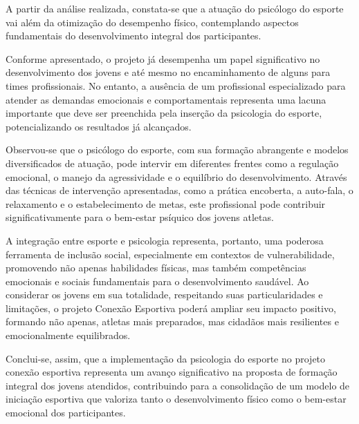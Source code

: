 \begin{Conclusao} %
A partir da análise realizada, constata-se que a atuação do psicólogo do esporte vai além da otimização do desempenho físico, contemplando aspectos fundamentais do desenvolvimento integral dos participantes.

Conforme apresentado, o projeto já desempenha um papel significativo no desenvolvimento dos jovens e até mesmo no encaminhamento de alguns para times profissionais. No entanto, a ausência de um profissional especializado para atender as demandas emocionais e comportamentais representa uma lacuna importante que deve ser preenchida pela inserção da psicologia do esporte, potencializando os resultados já alcançados.

Observou-se que o psicólogo do esporte, com sua formação abrangente e modelos diversificados de atuação, pode intervir em diferentes frentes como a regulação emocional, o manejo da agressividade e o equilíbrio do desenvolvimento. Através das técnicas de intervenção apresentadas, como a prática encoberta, a auto-fala, o relaxamento e o estabelecimento de metas, este profissional pode contribuir significativamente para o bem-estar psíquico dos jovens atletas.

A integração entre esporte e psicologia representa, portanto, uma poderosa ferramenta de inclusão social, especialmente em contextos de vulnerabilidade, promovendo não apenas habilidades físicas, mas também competências emocionais e sociais fundamentais para o desenvolvimento saudável. Ao considerar os jovens em sua totalidade, respeitando suas particularidades e limitações, o projeto Conexão Esportiva poderá ampliar seu impacto positivo, formando não apenas, atletas mais preparados, mas cidadãos mais resilientes e emocionalmente equilibrados.

Conclui-se, assim, que a implementação da psicologia do esporte no projeto conexão esportiva representa um avanço significativo na proposta de formação integral dos jovens atendidos, contribuindo para a consolidação de um modelo de iniciação esportiva que valoriza tanto o desenvolvimento físico como o bem-estar emocional dos participantes.
\end{Conclusao}